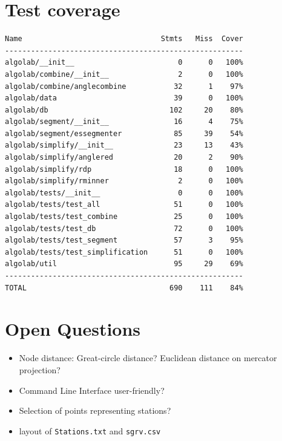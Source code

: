 \documentclass[twoside]{scrartcl}
\begin{document}
\section{Test coverage}
\begin{verbatim}
Name                                Stmts   Miss  Cover
-------------------------------------------------------
algolab/__init__                        0      0   100%
algolab/combine/__init__                2      0   100%
algolab/combine/anglecombine           32      1    97%
algolab/data                           39      0   100%
algolab/db                            102     20    80%
algolab/segment/__init__               16      4    75%
algolab/segment/essegmenter            85     39    54%
algolab/simplify/__init__              23     13    43%
algolab/simplify/anglered              20      2    90%
algolab/simplify/rdp                   18      0   100%
algolab/simplify/rminner                2      0   100%
algolab/tests/__init__                  0      0   100%
algolab/tests/test_all                 51      0   100%
algolab/tests/test_combine             25      0   100%
algolab/tests/test_db                  72      0   100%
algolab/tests/test_segment             57      3    95%
algolab/tests/test_simplification      51      0   100%
algolab/util                           95     29    69%
-------------------------------------------------------
TOTAL                                 690    111    84%
\end{verbatim}

\section{Open Questions}
\begin{itemize}
    \item Node distance: Great-circle distance? Euclidean distance on mercator projection?
    \item Command Line Interface user-friendly?
    \item Selection of points representing stations?
    \item layout of \texttt{Stations.txt} and \texttt{sgrv.csv}
\end{itemize}

\newpage
\end{document}
